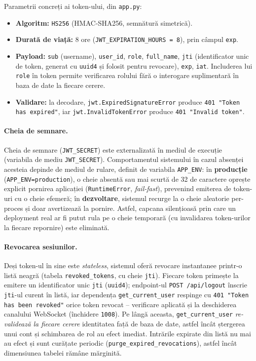 \documentclass[../../main.tex]{subfiles}
\begin{document}
Parametrii concreți ai token-ului, din \texttt{app.py}:
\begin{itemize}
    \item \textbf{Algoritm:} \texttt{HS256} (HMAC-SHA256, semnătură simetrică).
    \item \textbf{Durată de viață:} 8 ore (\texttt{JWT\_EXPIRATION\_HOURS = 8}), prin câmpul \texttt{exp}.
    \item \textbf{Payload:} \texttt{sub} (username), \texttt{user\_id}, \texttt{role}, \texttt{full\_name}, \texttt{jti} (identificator unic de token, generat cu \texttt{uuid4} și folosit pentru revocare), \texttt{exp}, \texttt{iat}. Includerea lui \texttt{role} în token permite verificarea rolului fără o interogare suplimentară în baza de date la fiecare cerere.
    \item \textbf{Validare:} la decodare, \texttt{jwt.ExpiredSignatureError} produce \texttt{401 \linebreak "Token has expired"}, iar \texttt{jwt.InvalidTokenError} produce \texttt{401 \linebreak "Invalid token"}.
\end{itemize}

\paragraph*{Cheia de semnare.} Cheia de semnare (\texttt{JWT\_SECRET}) este externalizată în mediul de execuție (variabila de mediu \texttt{JWT\_SECRET}).  Comportamentul sistemului în cazul absenței acesteia depinde de mediul de rulare, definit de variabila \texttt{APP\_ENV}: în \textbf{producție} (\texttt{APP\_ENV=production}), o cheie absentă sau mai scurtă de 32 de caractere oprește explicit pornirea aplicației (\texttt{RuntimeError}, \emph{fail-fast}), prevenind emiterea de token-uri cu o cheie efemeră; în \textbf{dezvoltare}, sistemul recurge la o cheie aleatorie per-proces și doar avertizează la pornire. Astfel, capcana silențioasă prin care un deployment real ar fi putut rula pe o cheie temporară (cu invalidarea token-urilor la fiecare repornire) este eliminată.

\paragraph*{Revocarea sesiunilor.} Deși token-ul în sine este \emph{stateless}, sistemul oferă revocare instantanee printr-o listă neagră (tabela \texttt{revoked\_tokens}, cu cheie \texttt{jti}). Fiecare token primește la emitere un identificator unic \texttt{jti} (\texttt{uuid4}); endpoint-ul \texttt{POST /api/logout} înscrie \texttt{jti}-ul curent în listă, iar dependența \texttt{get\_current\_\linebreak user} respinge cu \texttt{401 "Token has been revoked"} orice token revocat -- verificare aplicată și la deschiderea canalului WebSocket (închidere \texttt{1008}). Pe lângă aceasta, \texttt{get\_current\_user} \emph{re-validează la fiecare cerere} identitatea față de baza de date, astfel încât ștergerea unui cont și schimbarea de rol au efect imediat. Intrările expirate din listă nu mai au efect și sunt curățate periodic (\texttt{purge\_expired\_revocations}), astfel încât dimensiunea tabelei rămâne mărginită.
\end{document}
